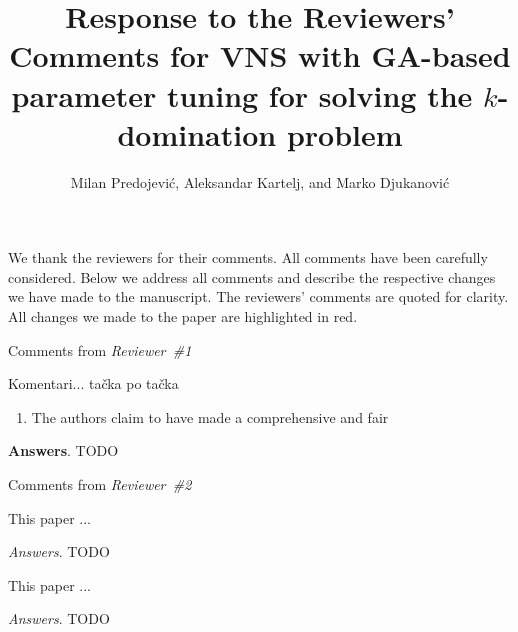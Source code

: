 \documentclass [11pt]{scrartcl}
\title{\Large{Response to the Reviewers' Comments for   VNS with GA-based parameter tuning for solving the $k$-domination problem} }
\author{{Milan Predojević}, {Aleksandar Kartelj}, and {Marko Djukanović} }
\begin{document}
\maketitle 

We thank the reviewers for their   comments. All comments have been carefully considered. Below we address all comments and describe the respective changes we have made to the manuscript. The reviewers' comments are quoted for clarity. All changes we made to the paper are highlighted in red.
  
\begin{center} 
Comments from \textit{Reviewer\ \#1}
\end{center}

\begin{leftbar}
  Komentari... tačka po tačka
   
   \begin{enumerate}
   	\item  The authors claim to have made a comprehensive and fair  
   \end{enumerate}

\end{leftbar}
\textbf{Answers}.  TODO

 
 
 
\begin{center} Comments from \textit{Reviewer\ \#2}
	
\end{center}

\begin{leftbar}
  
 This paper  ...
  
\end{leftbar}

\emph{Answers}. TODO 

\begin{leftbar}
	
	This paper  ...
	
\end{leftbar}

\emph{Answers}. TODO 
 
 
 
\end{document}
